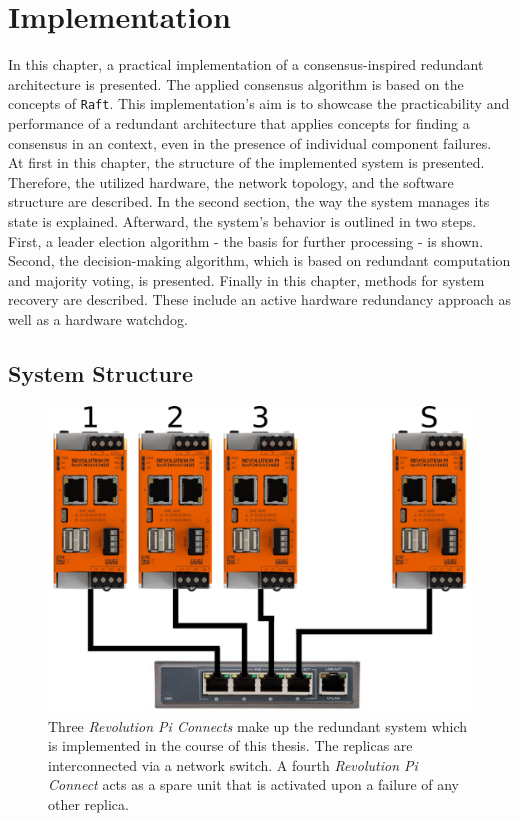 \chapter{Implementation}
\label{cpt:Implementation}

In this chapter, a practical implementation of a consensus-inspired redundant architecture is presented.
The applied consensus algorithm is based on the concepts of \texttt{Raft}.
This implementation's aim is to showcase the practicability and performance of a redundant architecture that applies  concepts for finding a consensus in an  context, even in the presence of individual component failures.
\\

At first in this chapter, the structure of the implemented system is presented.
Therefore, the utilized hardware, the network topology, and the software structure are described.
In the second section, the way the system manages its state is explained.
Afterward, the system's behavior is outlined in two steps.
First, a leader election algorithm - the basis for further processing - is shown.
Second, the decision-making algorithm, which is based on redundant computation and majority voting, is presented.
Finally in this chapter, methods for system recovery are described.
These include an active hardware redundancy approach as well as a hardware watchdog.

\section{System Structure}

\begin{figure}[!ht]
	\centering
	\includegraphics[width=0.8\linewidth]{images/setup}
	\caption{Three \textit{Revolution Pi Connects} make up the redundant system which is implemented in the course of this thesis. The replicas are interconnected via a network switch. A fourth \textit{Revolution Pi Connect} acts as a spare unit that is activated upon a failure of any other replica.}
	\label{fig:SystemSetup}
\end{figure}

